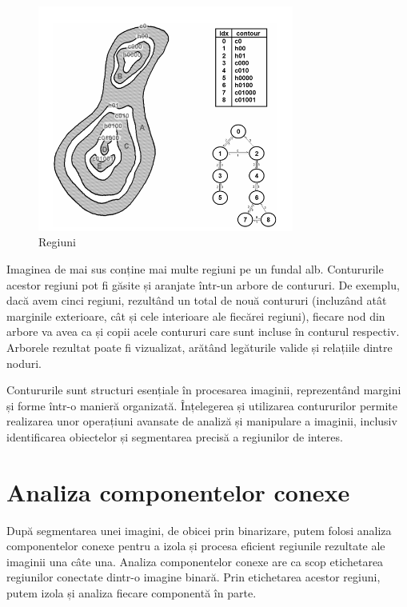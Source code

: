 \documentclass[a4paper,12pt]{report}
\begin{document}
\begin{figure}[h!]
    \centering
    \includegraphics[width=0.75\textwidth]{images/contours.jpg}
    \caption{Regiuni}
\end{figure}
\FloatBarrier

Imaginea de mai sus conține mai multe regiuni pe un fundal alb. Contururile acestor regiuni pot fi găsite și aranjate într-un arbore de contururi. De exemplu, dacă avem cinci regiuni, rezultând un total de nouă contururi (incluzând atât marginile exterioare, cât și cele interioare ale fiecărei regiuni), fiecare nod din arbore va avea ca și copii acele contururi care sunt incluse în conturul respectiv. Arborele rezultat poate fi vizualizat, arătând legăturile valide și relațiile dintre noduri.

Contururile sunt structuri esențiale în procesarea imaginii, reprezentând margini și forme într-o manieră organizată. Înțelegerea și utilizarea contururilor permite realizarea unor operațiuni avansate de analiză și manipulare a imaginii, inclusiv identificarea obiectelor și segmentarea precisă a regiunilor de interes.

\section{Analiza componentelor conexe}
După segmentarea unei imagini, de obicei prin binarizare, putem folosi analiza componentelor conexe pentru a izola și procesa eficient regiunile rezultate ale imaginii una câte una. Analiza componentelor conexe are ca scop etichetarea regiunilor conectate dintr-o imagine binară. Prin etichetarea acestor regiuni, putem izola și analiza fiecare componentă în parte.
\end{document}
